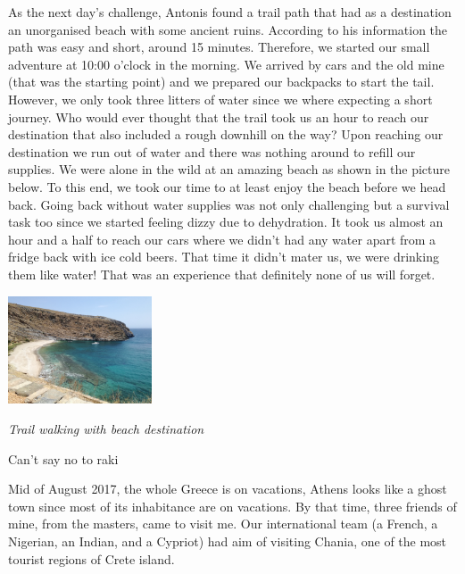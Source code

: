 \documentclass[10pt,a4paper]{article} %
\newcommand{\NewsItem}[1]{ %
\usefont{T1}{fvs}{n}{n} %
\vspace{24pt}\large #1\vspace{3pt} %
\par \normalsize \normalfont}
\begin{document}
\begin{multicols}{3}
As the next day's challenge, Antonis found a trail path that had as a destination 
an unorganised beach with some ancient ruins. 
According to his information the path was easy and short, around 15 minutes. 
Therefore, we started our small adventure at 10:00 o'clock in the morning. 
We arrived by cars and the old mine (that was the starting point) and we prepared 
our backpacks to start the tail. 
However, we only took three litters of water since we where expecting a short 
journey. 
Who would ever thought that the trail took us an hour to reach our destination 
that also included a rough downhill on the way?
Upon reaching our destination we run out of water and there was nothing around 
to refill our supplies. 
We were alone in the wild at an amazing beach as shown in the picture below. 
To this end, we took our time to at least enjoy the beach before we head back. 
Going back without water supplies was not only challenging but a survival task too 
since we started feeling dizzy due to dehydration.   
It took us almost an hour and a half to reach our cars where we didn't had any water 
apart from a fridge back with ice cold beers. 
That time it didn't mater us, we were  drinking them like water! 
That was an experience that definitely none of us will forget.  


\begin{center}
	\includegraphics[width=0.32\textwidth]{media/isolated_beach.jpg}
	\par\textit{Trail walking with beach destination}
\end{center}


\NewsItem{Can't say no to raki}

Mid of August 2017, the whole Greece is on vacations, Athens looks like a ghost 
town since most of its inhabitance are on vacations. 
By that time, three friends of mine, from the masters, came to visit me. 
Our international team (a French, a Nigerian, an Indian, and a Cypriot) had aim 
of visiting Chania, one of the most tourist regions of Crete island.   
 


\end{multicols}
\end{document}
